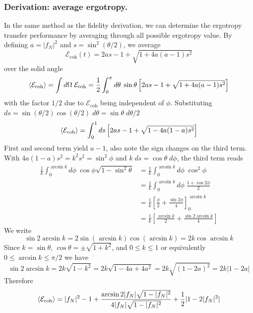 \documentclass[../../../main.tex]{subfiles}
\begin{document}
\subsubsection{Derivation: average ergotropy.}
In the same method as the fidelity derivation, we can determine the ergotropy transfer performance by averaging through all possible ergotropy value.
By defining $a = |f_N|^2$ and $s = \sin ^2 (\theta/2)$, we average
\begin{equation*}
  \mathcal{E}_\text{coh} (t) = 2as-1+\sqrt{1+4a(a-1)s^2}
\end{equation*}
over the solid angle
\begin{equation*}
  \braket{\mathcal{E}_\text{coh}} = \int d\Omega\; \mathcal{E}_\text{coh} = \frac{1 }{2 }\int_{0}^{\pi} d\theta\;\sin\theta \left[  2as-1+\sqrt{1+4a(a-1)s^2} \right]
\end{equation*}
with the factor $1/2$ due to $\mathcal{E}_\text{coh}$ being independent of $\phi$.
Substituting $ds = \sin (\theta/2)\cos (\theta/2)\;d\theta = \sin \theta\;d\theta/2$
\begin{equation*}
  \braket{\mathcal{E}_\text{coh}} = \int_{0}^{1} ds \left[  2as-1+\sqrt{1-4a(1-a)s^2} \right]
\end{equation*}
First and second term yield $a-1$, also note the sign changes on the third term.
With $4a(1-a)s^2=k^2s^2=\sin ^2\phi$ and $k\;ds=\cos\theta\;d\phi$, the third term reads
\begin{align*}
  \frac{1}{k }\int_{0}^{\arcsin k }d\phi\;\cos \phi \sqrt{1-\sin ^2\theta}
   & =
  \frac{1}{k }\int_{0}^{\arcsin k }d\phi\;\cos^2 \phi                                   \\
   & = \frac{1}{k }\int_{0}^{\arcsin k }d\phi\;\frac{1+\cos 2\phi}{2}                   \\
   & = \frac{1 }{k }\left[ \frac{\phi}{2}+ \frac{\sin 2\phi}{4} \right] _0^{\arcsin k } \\
   & = \frac{1 }{k }\left[ \frac{\arcsin k}{2}+ \frac{\sin 2\arcsin k}{4} \right]
\end{align*}
We write
\begin{equation*}
  \sin 2\arcsin k = 2 \sin(\arcsin k) \cos (\arcsin k) = 2k \cos \arcsin k
\end{equation*}
Since $k= \sin \theta$, $\cos \theta = \pm\sqrt{1+k^2}$, and $0\leq k\leq 1$ or equivalently $0\leq \arcsin k\leq \pi/2$ we have
\begin{equation*}
  \sin 2\arcsin k = 2k \sqrt{1-k^2} = 2k \sqrt{1-4a+4a^2} = 2k \sqrt{(1-2a)^2} = 2k|1-2a|
\end{equation*}
Therefore
\begin{equation*}
  \braket{\mathcal{E}_\text{coh}} = |f_N|^2-1 + \frac{\arcsin 2|f_N|\sqrt{1-|f_N|^2 }}{4|f_N|\sqrt{1-|f_N|^2}} + \frac{1 }{2} |1-2|f_N|^2 |
\end{equation*}
\end{document}
